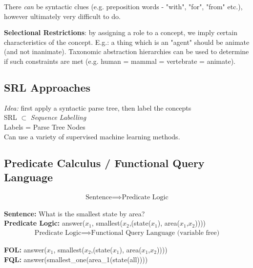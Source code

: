 \documentclass[]{article}
\begin{document}
	There \textit{can} be syntactic clues (e.g. preposition words - "with", "for", "from" etc.), however ultimately very difficult to do.
	
	\textbf{Selectional Restrictions}: by assigning a role to a concept, we imply certain characteristics of the concept. E.g.: a thing which is an "agent" should be animate (and not inanimate). Taxonomic abstraction hierarchies can be used to determine if such constraints are met (e.g. human = mammal = vertebrate = animate). 
	
	\subsection{SRL Approaches}
	
	\textit{Idea:} first apply a syntactic parse tree, then label the concepts \\
	SRL $\subset$ \textit{Sequence Labelling} \\
	Labels = Parse Tree Nodes \\
	
	Can use a variety of supervised machine learning methods.
	
	\subsection{Predicate Calculus / Functional Query Language}
	
	\begin{align}
	\text{Sentence} \implies \text{Predicate Logic}
	\end{align}

	\textbf{Sentence:} What is the smallest state by area? \\
	\textbf{Predicate Logic:} answer($x_1$, smallest($x_2$,(state($x_1$), area($x_1$,$x_2$)))) \\
	
	\begin{align}
		\text{Predicate Logic} \implies \text{Functional Query Language (variable free)}
	\end{align}
	
	\textbf{FOL:} answer($x_1$, smallest($x_2$,(state($x_1$), area($x_1$,$x_2$)))) \\
	\textbf{FQL:} answer(smallest\_one(area\_1(state(all)))) \\
	
	
	
	
	
\end{document}
